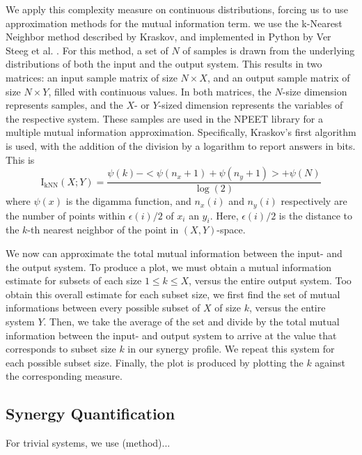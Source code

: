 \documentclass[../main.tex]{subfiles}
\begin{document}
We apply this complexity measure on continuous distributions, forcing us to use approximation methods for the mutual information term.
we use the k-Nearest Neighbor method described by Kraskov, and implemented in Python by Ver Steeg et al. \cite{kraskov2004estimating, versteeg2013NPEET}.
For this method, a set of $N$ of samples is drawn from the underlying distributions of both the input and the output system.
This results in two matrices: an input sample matrix of size $N \times X$, and an output sample matrix of size $N \times Y$, filled with continuous values.
In both matrices, the $N$-size dimension represents samples, and the $X$- or $Y$-sized dimension represents the variables of the respective system.
These samples are used in the NPEET library for a multiple mutual information approximation.
Specifically, Kraskov's first algorithm is used, with the addition of the division by a logarithm to report answers in bits.
This is
%
\begin{equation}
\mathrm{I}_\mathrm{kNN}(X;Y) = \frac{\psi(k) - < \psi(n_x + 1) + \psi(n_y + 1) > + \psi(N)}{\log(2)}
\end{equation}
%
where $\psi(x)$ is the digamma function, and $n_x(i)$ and $n_y(i)$ respectively are the number of points within $\epsilon(i)/2$ of $x_i$ an $y_i$. Here, $\epsilon(i)/2$ is the distance to the $k$-th nearest neighbor of the point in $(X,Y)$-space.

We now can approximate the total mutual information between the input- and the output system.
To produce a plot, we must obtain a mutual information estimate for subsets of each size $1 \le k \le X$, versus the entire output system.
Too obtain this overall estimate for each subset size, we first find the set of mutual informations between every possible subset of $X$ of size $k$, versus the entire system $Y$.
Then, we take the average of the set and divide by the total mutual information between the input- and output system to arrive at the value that corresponds to subset size $k$ in our synergy profile.
We repeat this system for each possible subset size.
Finally, the plot is produced by plotting the $k$ against the corresponding measure.

\subsection{Synergy Quantification}

For trivial systems, we use (method)...
\end{document}
